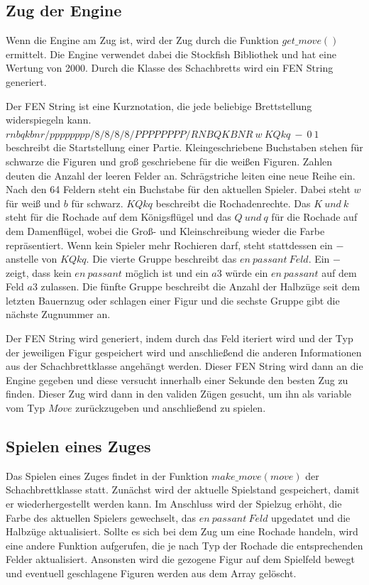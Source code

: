 \subsection{Zug der Engine}
Wenn die Engine am Zug ist, wird der Zug durch die Funktion \(get\_move()\) ermittelt. Die Engine verwendet dabei die Stockfish Bibliothek und hat eine Wertung von 2000.
Durch die Klasse des Schachbretts wird ein \ac{FEN} String generiert. 

Der \ac{FEN} String ist eine Kurznotation, die jede beliebige Brettstellung widerspiegeln kann.
\(rnbqkbnr/pppppppp/8/8/8/8/PPPPPPPP/RNBQKBNR~w~KQkq~-~0~1\) beschreibt die Startstellung einer Partie. Kleingeschriebene Buchstaben stehen für schwarze die Figuren
und groß geschriebene für die weißen Figuren. Zahlen deuten die Anzahl der leeren Felder an. Schrägstriche leiten eine neue Reihe ein.
Nach den 64 Feldern steht ein Buchstabe für den aktuellen Spieler. Dabei steht \(w\) für weiß und \(b\) für schwarz. \(KQkq\) beschreibt die Rochadenrechte.
Das \(K~und~k\) steht für die Rochade auf dem Königsflügel und das \(Q~und~q\) für die Rochade auf dem Damenflügel, wobei die Groß- und Kleinschreibung wieder die Farbe
repräsentiert. Wenn kein Spieler mehr Rochieren darf, steht stattdessen ein \(-\) anstelle von \(KQkq\). Die vierte Gruppe beschreibt das \(en~passant~Feld\). 
Ein \(-\) zeigt, dass kein \(en~passant\) möglich ist und ein \(a3\) würde ein \(en~passant\) auf dem Feld \(a3\) zulassen.
Die fünfte Gruppe beschreibt die Anzahl der Halbzüge seit dem letzten Bauernzug oder schlagen einer Figur und die sechste Gruppe gibt die nächste Zugnummer an.

Der \ac{FEN} String wird generiert, indem durch das Feld iteriert wird und der Typ der jeweiligen Figur gespeichert wird und 
anschließend die anderen Informationen aus der Schachbrettklasse angehängt werden. Dieser \ac{FEN} String wird dann an die Engine gegeben und diese versucht innerhalb
einer Sekunde den besten Zug zu finden. Dieser Zug wird dann in den validen Zügen gesucht, um ihn als variable vom Typ \(Move\) zurückzugeben und 
anschließend zu spielen.

\subsection{Spielen eines Zuges}
Das Spielen eines Zuges findet in der Funktion \(make\_move(move)\) der Schachbrettklasse statt. Zunächst wird der aktuelle Spielstand gespeichert, damit er
wiederhergestellt werden kann. Im Anschluss wird der Spielzug erhöht, die Farbe des aktuellen Spielers gewechselt, das \(en~passant~Feld\) upgedatet und die Halbzüge
aktualisiert.
Sollte es sich bei dem Zug um eine Rochade handeln, wird eine andere Funktion aufgerufen, die je nach Typ der Rochade die entsprechenden Felder aktualisiert.
Ansonsten wird die gezogene Figur auf dem Spielfeld bewegt und eventuell geschlagene Figuren werden aus dem Array gelöscht.

